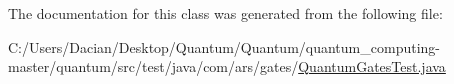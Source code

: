 The documentation for this class was generated from the following file\+:\begin{DoxyCompactItemize}
\item 
C\+:/\+Users/\+Dacian/\+Desktop/\+Quantum/\+Quantum/quantum\+\_\+computing-\/master/quantum/src/test/java/com/ars/gates/\hyperlink{_quantum_gates_test_8java}{Quantum\+Gates\+Test.\+java}\end{DoxyCompactItemize}
